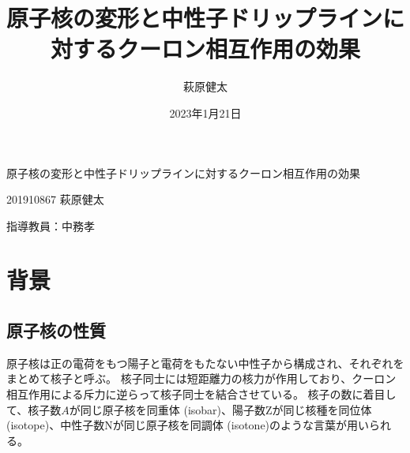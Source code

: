 \documentclass[12pt]{jarticle}
\title{原子核の変形と中性子ドリップラインに対するクーロン相互作用の効果}
\author{萩原健太}
\date{2023年1月21日}
\begin{document}
\begin{center}
    {\Large
        原子核の変形と中性子ドリップラインに対するクーロン相互作用の効果
    }
\end{center}
\vspace{1em}
\begin{flushright}
  201910867 萩原健太

  指導教員：中務孝
\end{flushright}


\section{背景}
\subsection{原子核の性質}
原子核は正の電荷をもつ陽子と電荷をもたない中性子から構成され、それぞれをまとめて核子と呼ぶ。
核子同士には短距離力の核力が作用しており、クーロン相互作用による斥力に逆らって核子同士を結合させている。
核子の数に着目して、核子数$A$が同じ原子核を同重体 (isobar)、陽子数Zが同じ核種を同位体 (isotope)、中性子数Nが同じ原子核を同調体 (isotone)のような言葉が用いられる。
\end{document}
